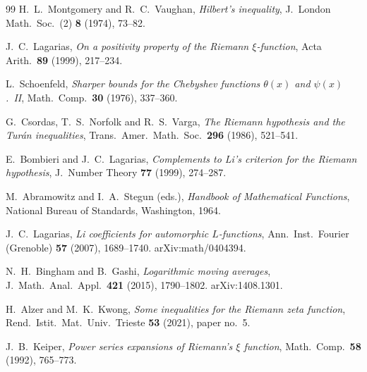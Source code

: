 \documentclass[11pt]{amsart}
\theoremstyle{definition}
\theoremstyle{remark}
\theoremstyle{definition}
\begin{document}
\begin{thebibliography}{99}
 H.~L.~Montgomery and R.~C.~Vaughan, \emph{Hilbert's inequality},
J.\ London Math.\ Soc.\ (2) \textbf{8} (1974), 73--82.

 J.~C.~Lagarias, \emph{On a positivity property of the Riemann $\xi$-function},
Acta Arith.\ \textbf{89} (1999), 217--234.

 L.~Schoenfeld, \emph{Sharper bounds for the Chebyshev functions $\theta(x)$
and $\psi(x)$.~II}, Math.\ Comp.\ \textbf{30} (1976), 337--360.

 G.~Csordas, T.~S.~Norfolk and R.~S.~Varga, \emph{The Riemann hypothesis
and the Tur\'an inequalities}, Trans.\ Amer.\ Math.\ Soc.\ \textbf{296} (1986), 521--541.

 E.~Bombieri and J.~C.~Lagarias, \emph{Complements to Li's criterion for
the Riemann hypothesis}, J.\ Number Theory \textbf{77} (1999), 274--287.

 M.~Abramowitz and I.~A.~Stegun (eds.), \emph{Handbook of Mathematical Functions}, National Bureau of Standards, Washington, 1964.

 J.~C.~Lagarias, \emph{Li coefficients for automorphic $L$-functions},
Ann.\ Inst.\ Fourier (Grenoble) \textbf{57} (2007), 1689--1740. arXiv:math/0404394.

 N.~H.~Bingham and B.~Gashi, \emph{Logarithmic moving
averages}, J.\ Math.\ Anal.\ Appl.\ \textbf{421} (2015), 1790--1802.
arXiv:1408.1301.

 H.~Alzer and M.~K.~Kwong, \emph{Some inequalities for the Riemann zeta
function}, Rend.\ Istit.\ Mat.\ Univ.\ Trieste \textbf{53} (2021), paper no.~5.

 J.~B.~Keiper, \emph{Power series expansions of Riemann's $\xi$ function}, Math.\
Comp.\ \textbf{58} (1992), 765--773.

\end{thebibliography}
\end{document}
